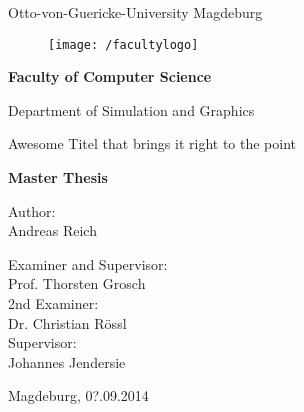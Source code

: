 \documentclass[thesis.tex]{subfiles}
\begin{document}
\thispagestyle {empty}

\begin{center}
\begin{Large}
Otto-von-Guericke-University Magdeburg\\

\begin{figure}
	\centering
	\texttt{[image: /facultylogo]}
	\label{fig:logoinffak}
\end{figure}

\vspace{3mm}

\textbf{Faculty of Computer Science}\\
\end{Large}

\vspace{3mm}

Department of Simulation and Graphics\\

\vspace{1cm}
\begin{LARGE}
Awesome Titel that brings it right to the point\\
\end{LARGE}
\vspace{15mm}
{\Huge \textbf{Master Thesis}}\\
\vspace{15mm}

Author:\\
\vspace{4mm}
{\Large Andreas Reich}\\

\vspace{14mm}

Examiner and Supervisor:\\
\vspace{2mm}
{\Large Prof. Thorsten Grosch}\\
\vspace{4mm}
2nd Examiner:\\
\vspace{2mm}
{\Large Dr. Christian Rössl}\\
\vspace{8mm}
Supervisor:\\
\vspace{2mm}
{\Large Johannes Jendersie}\\


\vspace{20mm}

{\large Magdeburg, 0?.09.2014}\\

\vspace{40mm}

\end{center}
\clearpage
\end{document}
